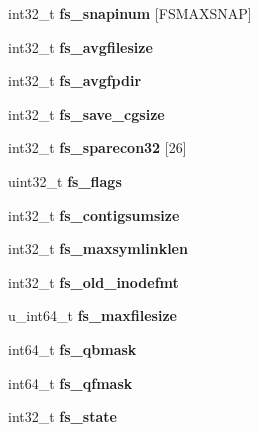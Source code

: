 \begin{DoxyCompactItemize}
int32\+\_\+t {\bfseries fs\+\_\+snapinum} \mbox{[}F\+S\+M\+A\+X\+S\+N\+AP\mbox{]}
\item 
\mbox{\label{structfs_a3d750fecfb70d46d78e3964c0fc62db0}} 
int32\+\_\+t {\bfseries fs\+\_\+avgfilesize}
\item 
\mbox{\label{structfs_a4e27ad3d243d1868c517c7f50db36c68}} 
int32\+\_\+t {\bfseries fs\+\_\+avgfpdir}
\item 
\mbox{\label{structfs_a296f6ea58ab5171bb0cebf8d9e9759b9}} 
int32\+\_\+t {\bfseries fs\+\_\+save\+\_\+cgsize}
\item 
\mbox{\label{structfs_aeaac93a705f4c2c2f2b194cc8772cc80}} 
int32\+\_\+t {\bfseries fs\+\_\+sparecon32} \mbox{[}26\mbox{]}
\item 
\mbox{\label{structfs_a2c4b8e157f0d2751e8e170dc14095465}} 
uint32\+\_\+t {\bfseries fs\+\_\+flags}
\item 
\mbox{\label{structfs_acdd52fe6ac532b73eb877c57b286dd93}} 
int32\+\_\+t {\bfseries fs\+\_\+contigsumsize}
\item 
\mbox{\label{structfs_abc0a279ec4d6a3f7a70e7078c9def3d3}} 
int32\+\_\+t {\bfseries fs\+\_\+maxsymlinklen}
\item 
\mbox{\label{structfs_a8fd0d606db522d961af347195bb59909}} 
int32\+\_\+t {\bfseries fs\+\_\+old\+\_\+inodefmt}
\item 
\mbox{\label{structfs_a80705fcf0b5478639af84da1d4c24e72}} 
u\+\_\+int64\+\_\+t {\bfseries fs\+\_\+maxfilesize}
\item 
\mbox{\label{structfs_aa771c09702d1e51ee526fb822e7230a5}} 
int64\+\_\+t {\bfseries fs\+\_\+qbmask}
\item 
\mbox{\label{structfs_ab48686a078d1a8410ec36696f0afeb05}} 
int64\+\_\+t {\bfseries fs\+\_\+qfmask}
\item 
\mbox{\label{structfs_a6c2e8cf33c773a90113fcc7fe9a75c51}} 
int32\+\_\+t {\bfseries fs\+\_\+state}
\item 

\end{DoxyCompactItemize}
